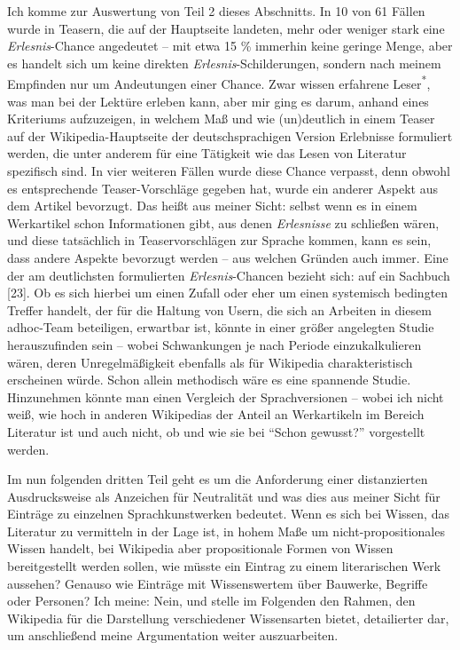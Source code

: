 \documentclass[fontsize=12pt]{scrartcl}
\begin{document}
Ich komme zur Auswertung von Teil 2 dieses Abschnitts. In 10 von 61 F\"allen wurde in Teasern, die auf der Hauptseite landeten, mehr oder weniger stark eine \textit{Erlesnis}-Chance angedeutet -- mit etwa 15 \% immerhin keine geringe Menge, aber es handelt sich um keine direkten \textit{Erlesnis}-Schil\-derungen, sondern nach meinem Empfinden nur um Andeutungen einer Chance. Zwar wissen erfahrene Leser\textsuperscript{\tiny{*}}, was man bei der Lekt\"ure erleben kann, aber mir ging es darum, anhand eines Kriteriums aufzuzeigen, in welchem Ma{\ss} und wie (un)deutlich in einem Teaser auf der Wi\-ki\-pe\-dia-Hauptseite der deutschspra\-chi\-gen Version Erlebnisse formuliert werden, die unter anderem f\"ur eine T\"atigkeit wie das Lesen von Li\-te\-ra\-tur spezifisch sind. In \mbox{vier} weiteren F\"allen wurde diese Chance verpasst, denn obwohl es entsprechende Teaser-Vorschl\"age ge\-ge\-ben hat, wurde ein an\-de\-rer Aspekt aus dem Artikel bevorzugt. Das hei{\ss}t aus meiner Sicht: \mbox{selbst} wenn es in einem Werkartikel schon Informationen gibt, aus denen \textit{Erlesnisse} zu schlie{\ss}en w\"aren, und diese tats\"achlich in Teaservorschl\"agen zur Sprache kommen, kann es sein, dass andere Aspekte bevorzugt werden -- aus welchen Gr\"unden auch immer. Eine der am deutlichsten formulierten \textit{Erlesnis}-Chancen bezieht sich: auf ein Sachbuch [23]. Ob es sich hierbei um einen Zufall oder eher um einen systemisch bedingten Treffer handelt, der f\"ur die Haltung von Usern, die sich an Arbei\-ten in diesem adhoc-Team beteiligen, erwartbar ist, k\"onnte in einer gr\"o{\ss}er angelegten Studie he\-rauszufinden sein -- wobei Schwankungen je nach Periode einzukalkulieren w\"aren, deren Unregelm\"a{\ss}igkeit ebenfalls als f\"ur Wi\-ki\-pe\-dia charakteristisch erscheinen w\"urde. Schon allein me\-tho\-disch w\"are es eine spannende Studie. Hinzunehmen k\"onnte man einen Vergleich der Sprachversionen -- wobei ich nicht wei{\ss}, wie hoch in anderen Wi\-ki\-pe\-dias der Anteil an Werkartikeln im \mbox{Bereich} Li\-te\-ra\-tur ist und auch nicht, ob und wie sie bei "`Schon gewusst?"' vorgestellt werden.

Im nun folgenden dritten Teil geht es um die Anforderung einer distanzierten Ausdrucksweise als Anzeichen f\"ur Neutralit\"at und was dies aus meiner Sicht f\"ur Eintr\"age zu einzelnen Sprachkunstwerken bedeutet. Wenn es sich bei Wissen, das Li\-te\-ra\-tur zu vermitteln in der Lage ist, in hohem Ma{\ss}e um nicht-pro\-po\-si\-ti\-o\-na\-les Wissen handelt, bei Wi\-ki\-pe\-dia aber pro\-po\-si\-ti\-o\-na\-le Formen von Wissen bereitgestellt werden sollen, wie m\"usste ein Eintrag zu einem li\-te\-ra\-rischen Werk aussehen? Genauso wie Eintr\"age mit Wissenswertem \"uber Bauwerke, Begriffe oder Per\-so\-nen? Ich meine: Nein, und stelle im Folgenden den Rahmen, den Wi\-ki\-pe\-dia f\"ur die Darstellung verschiedener Wissensarten bietet, detailierter dar, um anschlie{\ss}end meine Argumentation weiter auszuarbei\-ten.
\end{document}
